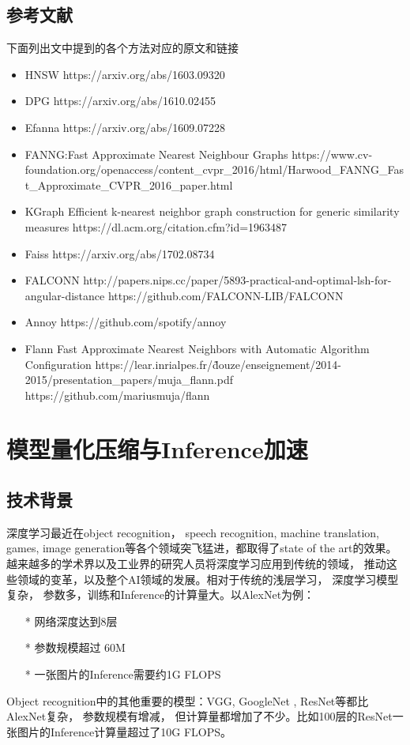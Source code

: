 \subsection{参考文献}
下面列出文中提到的各个方法对应的原文和链接
\begin{itemize}
\item HNSW
https://arxiv.org/abs/1603.09320
\item DPG
https://arxiv.org/abs/1610.02455
\item Efanna
https://arxiv.org/abs/1609.07228
\item FANNG:Fast Approximate Nearest Neighbour Graphs
https://www.cv-foundation.org/openaccess/content\_cvpr\_2016/html/Harwood\_FANNG\_Fast\_Approximate\_CVPR\_2016\_paper.html
\item KGraph
Efficient k-nearest neighbor graph construction for generic similarity measures
https://dl.acm.org/citation.cfm?id=1963487
\item Faiss
https://arxiv.org/abs/1702.08734
\item FALCONN
http://papers.nips.cc/paper/5893-practical-and-optimal-lsh-for-angular-distance
https://github.com/FALCONN-LIB/FALCONN
\item Annoy
https://github.com/spotify/annoy
\item Flann
Fast Approximate Nearest Neighbors with Automatic Algorithm Configuration
https://lear.inrialpes.fr/\~douze/enseignement/2014-2015/presentation\_papers/muja\_flann.pdf
https://github.com/mariusmuja/flann
\end{itemize}

\section{模型量化压缩与Inference加速}
\subsection{技术背景}

深度学习最近在object recognition， speech recognition, machine translation, games,  image generation等各个领域突飞猛进，都取得了state of the art的效果。越来越多的学术界以及工业界的研究人员将深度学习应用到传统的领域， 推动这些领域的变革，以及整个AI领域的发展。相对于传统的浅层学习， 深度学习模型复杂， 参数多，训练和Inference的计算量大。以AlexNet为例：
\begin{itemize}
\item[*] 网络深度达到8层
\item[*] 参数规模超过 60M
\item[*] 一张图片的Inference需要约1G FLOPS
\end{itemize} 
Object recognition中的其他重要的模型：VGG, GoogleNet , ResNet等都比AlexNet复杂， 参数规模有增减， 但计算量都增加了不少。比如100层的ResNet一张图片的Inference计算量超过了10G FLOPS。

